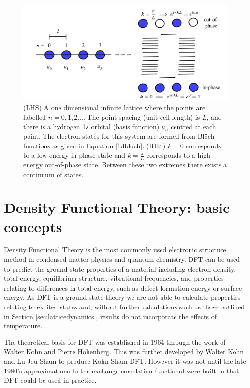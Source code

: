 \begin{figure}[h]
\centering
  \includegraphics[width=1.0\columnwidth]{figures/ch3/bands.png}
  \caption[In-phase and out-of-phase states in an infinite 1D crystal]{(LHS) A one dimensional infinite lattice where the points are labelled $n=0,1,2\ldots$. The point spacing (unit cell length) is $L$, and there is a hydrogen 1$s$ orbital (basis function) $u_n$ centred at each point. The electron states for this system are formed from Bl\"{o}ch functions as given in Equation \ref{1dbloch}. (RHS) $k=0$ corresponds to a low energy in-phase state and $k=\frac{\pi}{L}$ corresponds to a high energy out-of-phase state. Between these two extremes there exists a continuum of states.} 
  \label{bands}
\end{figure}


\section{Density Functional Theory: basic concepts} \label{DFTtheory}

Density Functional Theory is the most commonly used electronic structure method in condensed matter physics and quantum chemistry. 
DFT can be used to predict the ground state properties of a material including electron density, total energy, equilibrium structure, vibrational frequencies, and properties relating to differences in total energy, such as defect formation energy or surface energy. 
As DFT is a ground state theory we are not able to calculate properties relating to excited states and, without further calculations such as those outlined in Section \ref{sec:latticedynamics}, results do not incorporate the effects of temperature. 

The theoretical basis for DFT was established in 1964 through the work of Walter Kohn and Pierre Hohenberg.\autocite{Hohenberg1964} This was further developed by Walter Kohn and Lu Jeu Sham to produce Kohn-Sham DFT.\autocite{Kohn1965} However it was not until the late 1980's approximations to the exchange-correlation functional were built so that DFT could be used in practice. 

